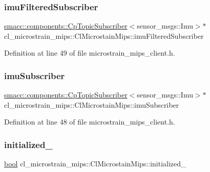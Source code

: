 \subsubsection{\texorpdfstring{imu\+Filtered\+Subscriber}{imuFilteredSubscriber}}
{\footnotesize\ttfamily \hyperlink{classsmacc_1_1components_1_1CpTopicSubscriber}{smacc\+::components\+::\+Cp\+Topic\+Subscriber}$<$sensor\+\_\+msgs\+::\+Imu$>$$\ast$ cl\+\_\+microstrain\+\_\+mips\+::\+Cl\+Microstain\+Mips\+::imu\+Filtered\+Subscriber}



Definition at line 49 of file microstrain\+\_\+mips\+\_\+client.\+h.

\mbox{\label{classcl__microstrain__mips_1_1ClMicrostainMips_a71648a9d970672d017c90bd3724b1104}} 
\subsubsection{\texorpdfstring{imu\+Subscriber}{imuSubscriber}}
{\footnotesize\ttfamily \hyperlink{classsmacc_1_1components_1_1CpTopicSubscriber}{smacc\+::components\+::\+Cp\+Topic\+Subscriber}$<$sensor\+\_\+msgs\+::\+Imu$>$$\ast$ cl\+\_\+microstrain\+\_\+mips\+::\+Cl\+Microstain\+Mips\+::imu\+Subscriber}



Definition at line 48 of file microstrain\+\_\+mips\+\_\+client.\+h.

\mbox{\label{classcl__microstrain__mips_1_1ClMicrostainMips_ac57a43d359bfadaf897b51a57ccb3dc8}} 
\subsubsection{\texorpdfstring{initialized\+\_\+}{initialized\_}}
{\footnotesize\ttfamily \hyperlink{classbool}{bool} cl\+\_\+microstrain\+\_\+mips\+::\+Cl\+Microstain\+Mips\+::initialized\+\_\+\hspace{0.3cm}{\ttfamily [protected]}}



